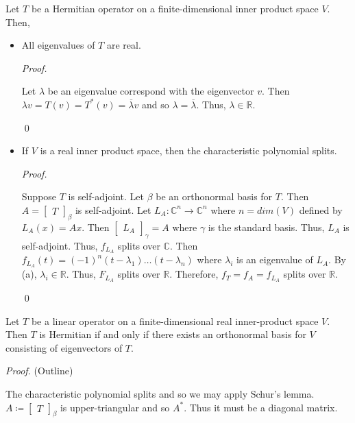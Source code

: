 \documentclass[12pt]{article}
\newenvironment{lemma}[2][Lemma]{\begin{trivlist}
\item[\hskip \labelsep {\bfseries #1}\hskip \labelsep {\bfseries #2.}]}{\end{trivlist}}
\newenvironment{theorem}[2][Theorem]{\begin{trivlist}
\item[\hskip \labelsep {\bfseries #1}\hskip \labelsep {\bfseries #2.}]}{\end{trivlist}}
\newenvironment{sol}
    {\emph{Proof.}
    }
    {
    \qed
    }
\begin{document}
\begin{lemma}{19}
Let $T$ be a Hermitian operator on a finite-dimensional inner product space $V$. Then,

\begin{itemize}
    \item[(a)] All eigenvalues of $T$ are real.
    
    \begin{sol}
    Let $\lambda$ be an eigenvalue correspond with the eigenvector $v$. Then $\lambda v = T(v) = T^*(v) = \overline{\lambda} v$ and so $\lambda = \overline{\lambda}$. Thus, $\lambda \in \mathbb{R}$.
    \end{sol}
    
    \item[(b)] If $V$ is a real inner product space, then the characteristic polynomial splits.
    
    \begin{sol}
    Suppose $T$ is self-adjoint. Let $\beta$ be an orthonormal basis for $T$. Then $A = \begin{bmatrix}
    T
    \end{bmatrix}_\beta$ is self-adjoint. Let $L_A : \mathbb{C}^n \to \mathbb{C}^n$ where $n = dim(V)$ defined by $L_A(x) = Ax$. Then $\begin{bmatrix}
    L_A
    \end{bmatrix}_\gamma = A$ where $\gamma$ is the standard basis. Thus, $L_A$ is self-adjoint. Thus, $f_{L_A}$ splits over $\mathbb{C}$. Then $f_{L_A}(t) = (-1)^n(t - \lambda_1) \dots (t - \lambda_n)$ where $\lambda_i$ is an eigenvalue of $L_A$. By (a), $\lambda_i \in \mathbb{R}$. Thus, $F_{L_A}$ splits over $\mathbb{R}$. Therefore, $f_T = f_A = f_{L_A}$ splits over $\mathbb{R}$.
    \end{sol}
\end{itemize}
\end{lemma}

\begin{theorem}{6.17}
Let $T$ be a linear operator on a finite-dimensional real inner-product space $V$. Then $T$ is Hermitian if and only if there exists an orthonormal basis for $V$ consisting of eigenvectors of $T$.
\end{theorem}

\textit{Proof.} (Outline)

The characteristic polynomial splits and so we may apply Schur's lemma. $A \coloneqq \begin{bmatrix} T \end{bmatrix}_\beta$ is upper-triangular and so $A^*$. Thus it must be a diagonal matrix.
\end{document}
